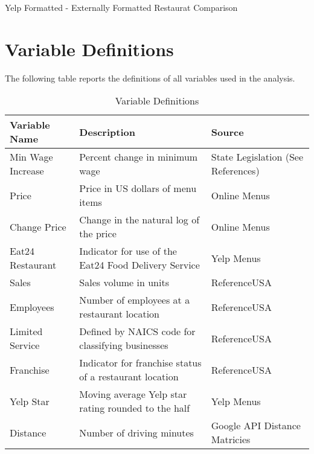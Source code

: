 \documentclass[11pt]{article}
\begin{document}
\begin{table}[H]\caption{Yelp Formatted - Externally Formatted Restaurat Comparison}
\begin{center}


\end{center}
\end{table}

\newpage

\section{Variable Definitions}
The following table reports the definitions of all variables used in the analysis.


\begin{center}

\begin{table}[H]\caption{Variable Definitions}
\begin{tabular}{l l l} \hline
Variable Name & Description & Source \\ \hline
Min Wage Increase & Percent change in minimum wage & State Legislation (See References) \\
Price & Price in US dollars of menu items  & Online Menus \\
Change Price & Change in the natural log of the price & Online Menus \\
Eat24 Restaurant & Indicator for use of the Eat24 Food Delivery Service & Yelp Menus \\
Sales & Sales volume in units & ReferenceUSA\\
Employees & Number of employees at a restaurant location & ReferenceUSA  \\
Limited Service & Defined by NAICS code for classifying businesses & ReferenceUSA \\
Franchise & Indicator for franchise status of a restaurant location & ReferenceUSA \\
Yelp Star & Moving average Yelp star rating rounded to the half & Yelp Menus\\
Distance & Number of driving minutes & Google API Distance Matricies\\
\end{tabular}

\end{table}

\end{center}
\end{document}

